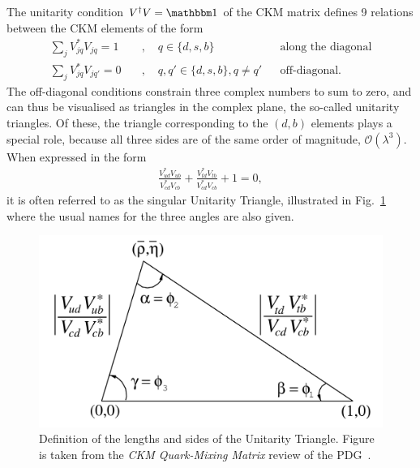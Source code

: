 The unitarity condition $V^\dagger V = \mathbbm 1$ of the CKM matrix defines 9 relations between the CKM elements of the form
\begin{subequations}
    \begin{align}
    \sum_j V^*_{jq}V_{jq} = 1\quad&,\quad q\in\{d, s, b\} & &\text{along the diagonal} \\
    \sum_j V^*_{jq}V_{jq'} = 0\quad&,\quad q, q'\in\{d, s, b\}, q\neq q' & &\text{off-diagonal}.
\end{align}
\end{subequations}
The off-diagonal conditions constrain three complex numbers to sum to zero, and can thus be visualised as triangles in the complex plane, the so-called unitarity triangles. Of these, the triangle corresponding to the $(d, b)$ elements plays a special role, because all three sides are of the same order of magnitude, $\mathcal O(\lambda^3)$. When expressed in the form
\begin{align}
    \frac{V^*_{ud}V_{ub}}{V^*_{cd}V_{cb}} +  \frac{V^*_{td}V_{tb}}{V^*_{cd}V_{cb}} +1 = 0,
\end{align}
it is often referred to as the singular Unitarity Triangle, illustrated in Fig.~\ref{fig:UT_definition} where the usual names for the three angles are also given.

\begin{figure}[tb]
    \centering
    \includegraphics[width=0.7\columnwidth]{figures/theory/UT_definition.png}
    \caption{Definition of the lengths and sides of the Unitarity Triangle. Figure is taken from the \emph{CKM Quark-Mixing Matrix} review of the PDG~\cite{PDG2020}.}
    \label{fig:UT_definition}
\end{figure}


